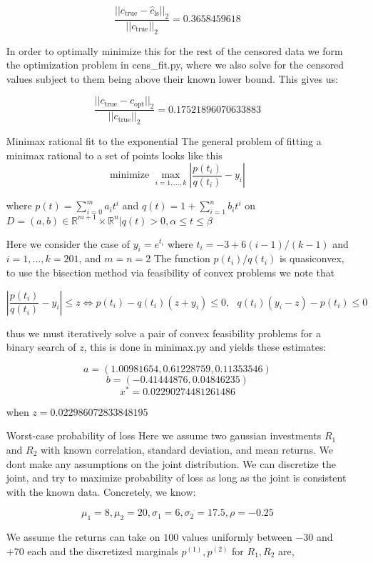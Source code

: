 \documentclass[12pt]{article}
\begin{document}
\begin{itemize}
  $$\frac{||c_{\text{true}} - \hat{c}_{\text{ls}}||_2}{||c_{\text{true}}||_2} = 0.3658459618$$

  In order to optimally minimize this for the rest of the censored data we form the optimization problem in cens_fit.py, where we also solve for the censored values subject to them being above their known lower bound. This gives us:

  $$\frac{||c_{\text{true}} - \hat{c}_{\text{opt}}||_2}{||c_{\text{true}}||_2} = 0.17521896070633883$$

\item[Minimax rational fit to the exponential]
  The general problem of fitting a minimax rational to a set of points looks like this
  $$\text{minimize } \max_{i=1,\ldots,k} \left| \frac{p(t_i)}{q(t_i)} - y_i \right|$$
  
  where $p(t) = \sum_{i=0}^m a_i t^i$ and $q(t) = 1 + \sum_{i=1}^n b_i t^i$ on $D = {(a,b) \in \mathbb{R}^{m+1} \times \mathbb{R}^n | q(t) > 0, \alpha \leq t \leq \beta }$

  Here we consider the case of $y_i = e^{t_i}$ where $t_i = -3 + 6(i-1)/(k-1)$ and $i = 1,\ldots,k=201$, and $m = n = 2$
  The function $p(t_i) / q(t_i)$ is quasiconvex, to use the bisection method via feasibility of convex problems we note that

  $$\left| \frac{p(t_i)}{q(t_i)} - y_i \right| \leq z \iff p(t_i) - q(t_i)(z+y_i) \leq 0 ,\text{ } q(t_i)(y_i - z) - p(t_i) \leq 0$$

  thus we must iteratively solve a pair of convex feasibility problems for a binary search of $z$, this is done in minimax.py
  and yields these estimates:

  $$a = (1.00981654, 0.61228759, 0.11353546)$$
  $$b = (-0.41444876,  0.04846235)$$
  $$x^* = 0.02290274481261486$$

  when $z = 0.022986072833848195$

\item[Worst-case probability of loss]
  Here we assume two gaussian investments $R_1$ and $R_2$ with known correlation, standard deviation, and mean returns. We dont make any assumptions on the joint distribution.
  We can discretize the joint, and try to maximize probability of loss as long as the joint is consistent with the known data. Concretely, we know:

  $$\mu_1 = 8, \mu_2 = 20, \sigma_1 = 6, \sigma_2 = 17.5, \rho = -0.25$$

  We assume the returns can take on $100$ values uniformly between $-30$ and $+70$ each and the discretized marginals $p^{(1)}, p^{(2)}$ for $R_1, R_2$ are,


\end{itemize}
\end{document}
